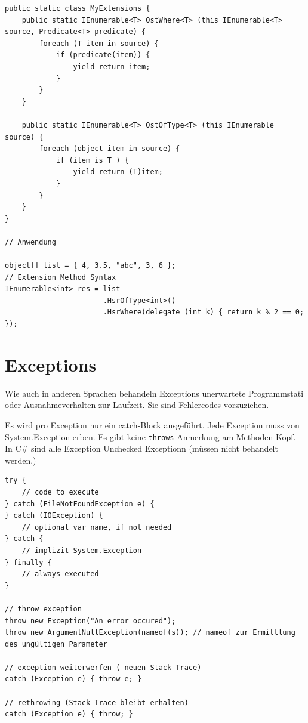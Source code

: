 \documentclass[
a4paper,
oneside,
10pt,
fleqn,
headsepline,
toc=listofnumbered, 
bibliography=totocnumbered]{scrartcl}
\let\stdsection\section
\renewcommand\section{\clearpage\stdsection}
\begin{document}
\begin{lstlisting}
public static class MyExtensions {
	public static IEnumerable<T> OstWhere<T> (this IEnumerable<T> source, Predicate<T> predicate) {
		foreach (T item in source) {
			if (predicate(item)) {
				yield return item;
			}
		}
	}
	
	public static IEnumerable<T> OstOfType<T> (this IEnumerable source) {
		foreach (object item in source) {
			if (item is T ) {
				yield return (T)item;
			}
		}
	}
}

// Anwendung

object[] list = { 4, 3.5, "abc", 3, 6 };
// Extension Method Syntax 
IEnumerable<int> res = list
                       .HsrOfType<int>()
                       .HsrWhere(delegate (int k) { return k % 2 == 0; }); 
\end{lstlisting}

\section{Exceptions}
Wie auch in anderen Sprachen behandeln Exceptions unerwartete Programmstati oder Ausnahmeverhalten zur Laufzeit. Sie sind Fehlercodes vorzuziehen.

Es wird pro Exception nur ein catch-Block ausgeführt. Jede Exception muss von System.Exception erben. Es gibt keine \lstinline|throws| Anmerkung am Methoden Kopf.
In C\# sind alle Exception Unchecked Exceptionn (müssen nicht behandelt werden.)
\begin{lstlisting}
try {
    // code to execute
} catch (FileNotFoundException e) {
} catch (IOException) {
	// optional var name, if not needed
} catch {
	// implizit System.Exception
} finally {
	// always executed
}

// throw exception
throw new Exception("An error occured");
throw new ArgumentNullException(nameof(s)); // nameof zur Ermittlung des ungültigen Parameter

// exception weiterwerfen ( neuen Stack Trace)
catch (Exception e) { throw e; }

// rethrowing (Stack Trace bleibt erhalten)
catch (Exception e) { throw; } 
\end{lstlisting}
\end{document}

